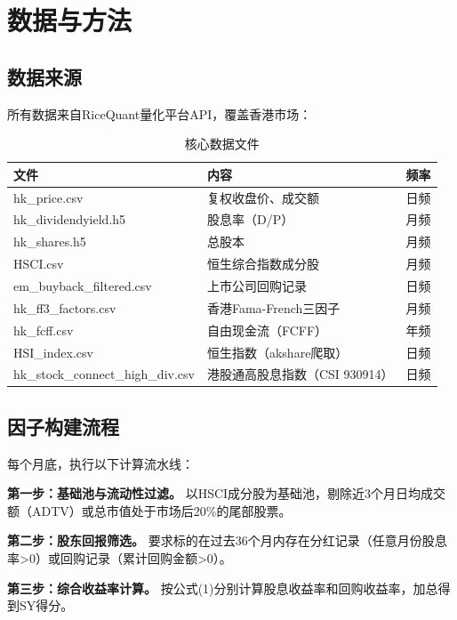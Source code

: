\documentclass[10pt,a4paper]{ctexart}
\begin{document}
\section{数据与方法}

\subsection{数据来源}

所有数据来自RiceQuant量化平台API，覆盖香港市场：

\begin{table}[htbp]
\centering
\caption{核心数据文件}
\begin{tabular}{lll}
\toprule
\textbf{文件} & \textbf{内容} & \textbf{频率} \\
\midrule
hk\_price.csv & 复权收盘价、成交额 & 日频 \\
hk\_dividendyield.h5 & 股息率（D/P） & 月频 \\
hk\_shares.h5 & 总股本 & 月频 \\
HSCI.csv & 恒生综合指数成分股 & 月频 \\
em\_buyback\_filtered.csv & 上市公司回购记录 & 日频 \\
hk\_ff3\_factors.csv & 香港Fama-French三因子 & 月频 \\
hk\_fcff.csv & 自由现金流（FCFF） & 年频 \\
HSI\_index.csv & 恒生指数（akshare爬取） & 日频 \\
hk\_stock\_connect\_high\_div.csv & 港股通高股息指数（CSI 930914） & 日频 \\
\bottomrule
\end{tabular}
\end{table}

\subsection{因子构建流程}

每个月底，执行以下计算流水线：

\textbf{第一步：基础池与流动性过滤。} 以HSCI成分股为基础池，剔除近3个月日均成交额（ADTV）或总市值处于市场后20\%的尾部股票。

\textbf{第二步：股东回报筛选。} 要求标的在过去36个月内存在分红记录（任意月份股息率>0）或回购记录（累计回购金额>0）。

\textbf{第三步：综合收益率计算。} 按公式(1)分别计算股息收益率和回购收益率，加总得到SY得分。
\end{document}
